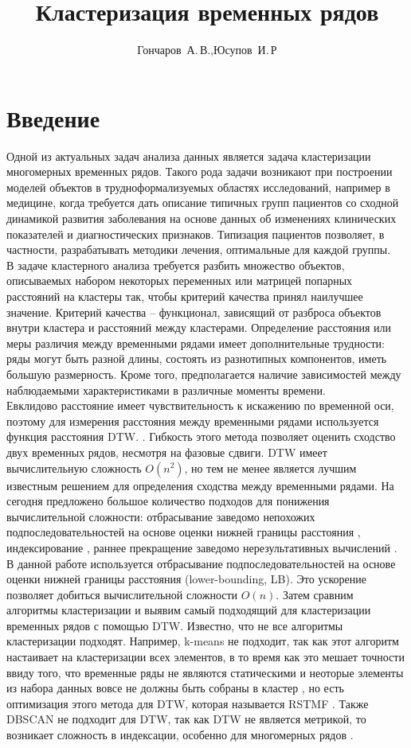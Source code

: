 \documentclass[12pt,twoside]{article}
\title
        {Кластеризация временных рядов}
\author
        {Гончаров~А.\,В.,Юсупов~И.\,Р} %
\begin{document}
    \maketitle
    \section{Введение}
        Одной из актуальных задач анализа данных является задача кластеризации многомерных временных рядов. Такого рода задачи возникают при построении моделей объектов в трудноформализуемых областях
        исследований, например в медицине, когда требуется дать описание типичных групп пациентов со сходной динамикой развития заболевания на основе данных об изменениях клинических показателей и диагностических признаков. Типизация пациентов позволяет, в частности, разрабатывать методики лечения, оптимальные для каждой группы.\\
        В задаче кластерного анализа требуется разбить множество объектов, описываемых набором некоторых переменных или матрицей попарных расстояний на кластеры так, чтобы критерий качества принял наилучшее значение. Критерий качества – функционал, зависящий от разброса объектов  внутри кластера  и расстояний между кластерами. Определение расстояния или меры различия между временными рядами имеет дополнительные трудности: ряды могут быть разной длины, состоять из разнотипных компонентов, иметь большую размерность. Кроме того, предполагается наличие зависимостей между наблюдаемыми характеристиками в различные моменты времени.\\
        Евклидово расстояние имеет чувствительность к искажению по временной оси, поэтому для измерения расстояния между временными рядами используется функция расстояния DTW. \cite{berndt1994using}.  Гибкость этого метода позволяет оценить сходство двух временных рядов, несмотря на фазовые сдвиги.  DTW имеет вычислительную сложность $O(n^2)$, но тем не менее является лучшим известным решением для определения сходства между временными рядами. На сегодня предложено большое количество подходов для понижения вычислительной сложности: отбрасывание заведомо непохожих подпоследовательностей на основе оценки нижней границы расстояния \cite{ding2008querying, camerra2010isax},  индексирование \cite{lim2006using}, раннее прекращение заведомо нерезультативных вычислений \cite{rakthanmanon2012searching}.  В данной работе используется отбрасывание подпоследовательностей на основе оценки нижней границы расстояния (lower-bounding, LB). Это ускорение позволяет добиться вычислительной сложности $O(n)$\cite{rakthanmanon2012searching}.  Затем сравним алгоритмы кластеризации и выявим самый подходящий для кластеризации временных рядов с помощью DTW. Известно, что не все алгоритмы кластеризации подходят. Например, k-means не подходит, так как этот алгоритм настаивает на кластеризации всех элементов, в то время как это мешает точности ввиду того, что временные ряды не являются статическими и неоторые элементы из набора данных вовсе не должны быть собраны в кластер \cite{begum2015accelerating}, но есть оптимизация этого метода для DTW, которая называется RSTMF \cite{meesrikamolkul2012shape}. Также DBSCAN не подходит для DTW, так как DTW не является метрикой, то возникает сложность в индексации, особенно для многомерных рядов \cite{begum2015accelerating}. 
\end{document}

